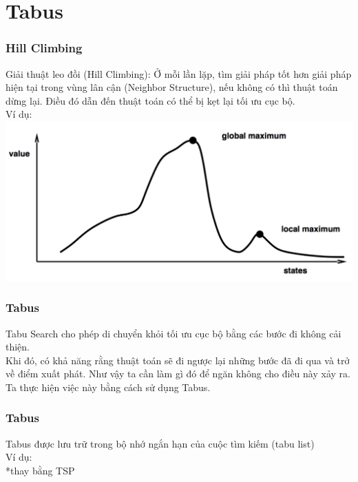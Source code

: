\documentclass[12pt]{beamer}
\begin{document}
	\section{Tabus}
	\begin{frame}
		\frametitle{Hill Climbing}
		Giải thuật leo đồi (Hill Climbing): Ở mỗi lần lặp, tìm giải pháp tốt hơn giải pháp hiện tại trong vùng lân cận (Neighbor Structure), nếu không có thì thuật toán dừng lại. Điều đó dẫn đến thuật toán có thể bị kẹt lại tối ưu cục bộ.\\
		Ví dụ:\\
		\includegraphics[scale=0.4]{HillClimbing.png}\\
	\end{frame}

	\begin{frame}
		\frametitle{Tabus}
		Tabu Search cho phép di chuyển khỏi tối ưu cục bộ bằng các bước đi không cải thiện.\\
		Khi đó, có khả năng rằng thuật toán sẽ đi ngược lại những bước đã đi qua và trở về điểm xuất phát. Như vậy ta cần làm gì đó để ngăn không cho điều này xảy ra.\\
		Ta thực hiện việc này bằng cách sử dụng Tabus.
	\end{frame}

	\begin{frame}
		\frametitle{Tabus}
		Tabus được lưu trữ trong bộ nhớ ngắn hạn của cuộc tìm kiếm (tabu list)\\
		Ví dụ:\\
		*thay bằng TSP
	\end{frame}
	
\end{document}
